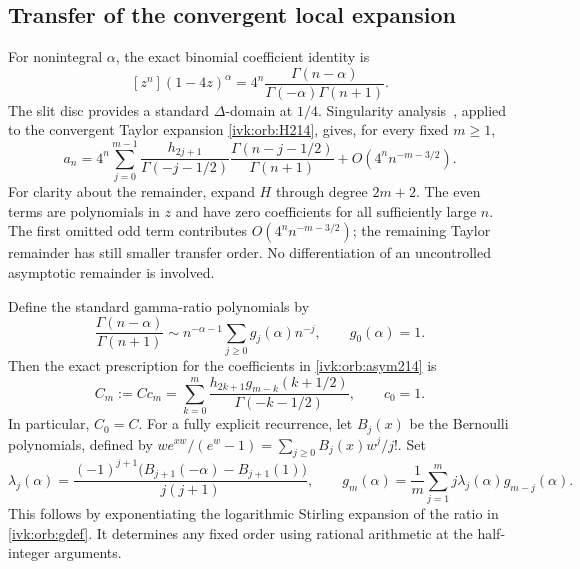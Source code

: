 \documentclass[11pt,letterpaper]{article}
\theoremstyle{remark}\newtheorem{remark}[theorem]{Remark}
\begin{document}
\subsection{Transfer of the convergent local expansion}
For nonintegral $\alpha$, the exact binomial coefficient identity is
\begin{equation}\label{ivk:orb:gammaratio}
[z^n](1-4z)^\alpha
=4^n\frac{\Gamma(n-\alpha)}{\Gamma(-\alpha)\Gamma(n+1)}.
\end{equation}
The slit disc provides a standard $\Delta$-domain at $1/4$.
Singularity analysis~\cite[Chapter VI]{fs}, applied to the convergent
Taylor expansion \eqref{ivk:orb:H214}, gives, for every fixed $m\ge1$,
\begin{equation}\label{ivk:orb:finitegamma}
a_n=4^n\sum_{j=0}^{m-1}
\frac{h_{2j+1}}{\Gamma(-j-1/2)}
\frac{\Gamma(n-j-1/2)}{\Gamma(n+1)}
+O(4^nn^{-m-3/2}).
\end{equation}
For clarity about the remainder, expand $H$ through degree $2m+2$.
The even terms are polynomials in $z$ and have zero coefficients for
all sufficiently large $n$. The first omitted odd term contributes
$O(4^nn^{-m-3/2})$; the remaining Taylor remainder has still smaller
transfer order. No differentiation of an uncontrolled asymptotic
remainder is involved.

Define the standard gamma-ratio polynomials by
\begin{equation}\label{ivk:orb:gdef}
\frac{\Gamma(n-\alpha)}{\Gamma(n+1)}
\sim n^{-\alpha-1}\sum_{j\ge0}g_j(\alpha)n^{-j},
\qquad g_0(\alpha)=1.
\end{equation}
Then the exact prescription for the coefficients in \eqref{ivk:orb:asym214} is
\begin{equation}\label{ivk:orb:Crec}
C_m:=C c_m=\sum_{k=0}^{m}
\frac{h_{2k+1}g_{m-k}(k+1/2)}{\Gamma(-k-1/2)},
\qquad c_0=1.
\end{equation}
In particular, $C_0=C$. For a fully explicit recurrence, let $B_j(x)$
be the Bernoulli polynomials, defined by
$we^{xw}/(e^w-1)=\sum_{j\ge0}B_j(x)w^j/j!$. Set
\begin{equation}\label{ivk:orb:grec}
\lambda_j(\alpha)=
\frac{(-1)^{j+1}\bigl(B_{j+1}(-\alpha)-B_{j+1}(1)\bigr)}{j(j+1)},
\qquad
g_m(\alpha)=\frac1m\sum_{j=1}^{m}j\lambda_j(\alpha)g_{m-j}(\alpha).
\end{equation}
This follows by exponentiating the logarithmic Stirling expansion of
the ratio in \eqref{ivk:orb:gdef}. It determines any fixed order using rational
arithmetic at the half-integer arguments.
\end{document}
